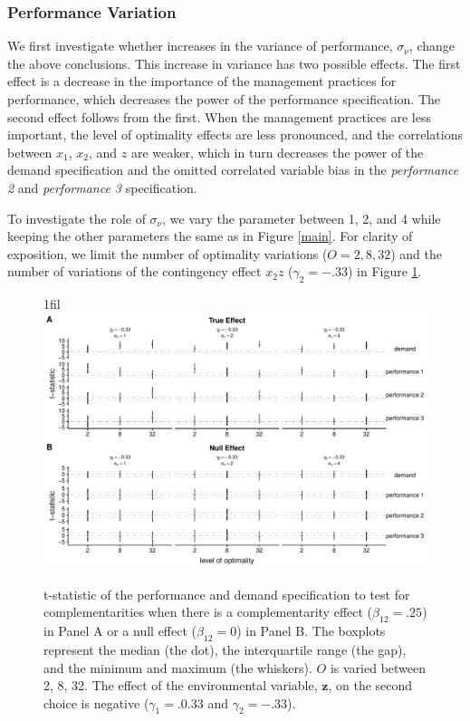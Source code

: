 \documentclass[12pt]{article}
\makeatletter
\newcommand*{\centerfloat}{%
  \parindent \z@
  \leftskip \z@ \@plus 1fil \@minus \textwidth
  \rightskip\leftskip
  \parfillskip \z@skip}
\makeatother
\begin{document}
\subsubsection{Performance Variation}\label{performance-variation}

We first investigate whether increases in the variance of performance, $\sigma_{\nu}$, change the above conclusions. This increase in variance has two possible effects. The first effect is a decrease in the importance of the management practices for performance, which decreases the power of the performance specification. The second effect follows from the first. When the management practices are less important, the level of optimality effects are less pronounced, and the correlations between $x_1$, $x_2$, and $z$ are weaker, which in turn decreases the power of the demand specification and the omitted correlated variable bias in the \emph{performance 2} and \emph{performance 3} specification.

To investigate the role of $\sigma_{\nu}$, we vary the parameter between 1, 2, and 4 while keeping the other parameters the same as in Figure \ref{main}. For clarity of exposition, we limit the number of optimality variations ($O = 2, 8, 32$) and the number of variations of the contingency effect $x_2 z$ ($\gamma_2 = -.33$) in Figure \ref{noise}.

\begin{figure}
\centerfloat
\includegraphics[width=450px]{figure-latex/noise_new_plot.pdf}
\caption[Error Rate and Power with Increasing Levels of Variability in Performance]
{\label{noise} t-statistic of the performance and demand specification to test
for complementarities when there is a complementarity effect ($\beta_{12} = .25$)
in Panel A or a null effect ($\beta_{12} = 0$) in Panel B. The boxplots represent the median (the dot), the interquartile range (the gap), and the minimum and maximum (the whiskers). $O$ is varied between 2, 8, 32. The effect of the environmental variable, $\mathbf{z}$, on the second choice is negative ($\gamma_1 = .0.33$ and $\gamma_2 = -.33$).}
\end{figure}
\end{document}
